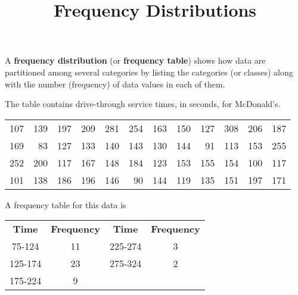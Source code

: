 \documentclass{beamer}
\title[MA205 - Section 2.1]{Frequency Distributions}
\begin{document}
\begin{frame}
\titlepage
\end{frame}

\begin{frame}
\begin{definition}
A \textbf{frequency distribution} (or \textbf{frequency table}) shows how data are partitioned among several categories by listing the categories (or classes) along with the number (frequency) of data values in each of them.
\end{definition}\pause

\begin{example}
The table contains drive-through service times, in seconds, for McDonald's.
\begin{center}
\begin{tabular}{rrrrrrrrrrrr}
107 & 139 & 197 & 209 & 281 & 254 & 163 & 150 & 127 & 308 & 206 & 187 \\
169 &  83 & 127 & 133 & 140 & 143 & 130 & 144 &  91 & 113 & 153 & 255 \\
252 & 200 & 117 & 167 & 148 & 184 & 123 & 153 & 155 & 154 & 100 & 117 \\
101 & 138 & 186 & 196 & 146 &  90 & 144 & 119 & 135 & 151 & 197 & 171 \\
\end{tabular}
\end{center}\pause

A frequency table for this data is
\begin{center}
\begin{tabular}{cc|cc}
\textbf{Time} & \textbf{Frequency} & \textbf{Time} & \textbf{Frequency} \\
75-124  & 11 & 225-274 &  3\\
125-174 & 23 & 275-324 &  2\\
175-224 &  9 
\end{tabular}
\end{center}
\end{example}
\end{frame}
\end{document}
